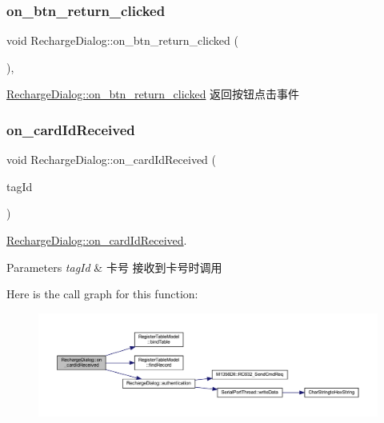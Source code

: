 \subsubsection{\texorpdfstring{on\_btn\_return\_clicked}{on\_btn\_return\_clicked}}
{\footnotesize\ttfamily void Recharge\+Dialog\+::on\+\_\+btn\+\_\+return\+\_\+clicked (\begin{DoxyParamCaption}{ }\end{DoxyParamCaption})\hspace{0.3cm}{\ttfamily [private]}, {\ttfamily [slot]}}



\mbox{\hyperlink{class_recharge_dialog_acead4cd4509b27f98895adc69b77c9fd}{Recharge\+Dialog\+::on\+\_\+btn\+\_\+return\+\_\+clicked}} 返回按钮点击事件 

\mbox{\label{class_recharge_dialog_adf95e380b531e5817063abac78cdd607}} 
\subsubsection{\texorpdfstring{on\_cardIdReceived}{on\_cardIdReceived}}
{\footnotesize\ttfamily void Recharge\+Dialog\+::on\+\_\+card\+Id\+Received (\begin{DoxyParamCaption}\item[{Q\+String}]{tag\+Id }\end{DoxyParamCaption})\hspace{0.3cm}{\ttfamily [slot]}}



\mbox{\hyperlink{class_recharge_dialog_adf95e380b531e5817063abac78cdd607}{Recharge\+Dialog\+::on\+\_\+card\+Id\+Received}}. 


\begin{DoxyParams}{Parameters}
{\em tag\+Id} & 卡号 接收到卡号时调用 \\
\hline
\end{DoxyParams}
Here is the call graph for this function\+:
\nopagebreak
\begin{figure}[H]
\begin{center}
\leavevmode
\includegraphics[width=350pt]{class_recharge_dialog_adf95e380b531e5817063abac78cdd607_cgraph}
\end{center}
\end{figure}
\mbox{\label{class_recharge_dialog_adfce62fdba02f8a9f105b646d86957aa}} 
